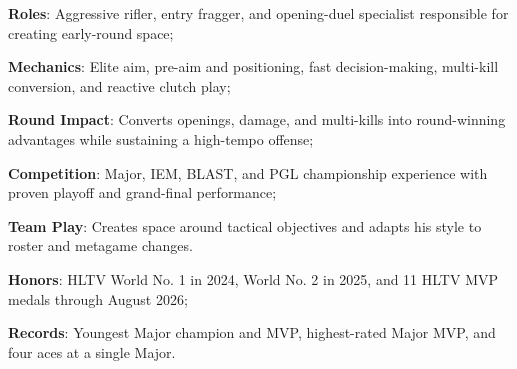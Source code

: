 \documentclass[private]{chicv}
\begin{document}


\begin{cvitems}
  \item \textbf{Roles}: Aggressive rifler, entry fragger, and opening-duel specialist responsible for creating early-round space;
  \item \textbf{Mechanics}: Elite aim, pre-aim and positioning, fast decision-making, multi-kill conversion, and reactive clutch play;
  \item \textbf{Round Impact}: Converts openings, damage, and multi-kills into round-winning advantages while sustaining a high-tempo offense;
  \item \textbf{Competition}: Major, IEM, BLAST, and PGL championship experience with proven playoff and grand-final performance;
  \item \textbf{Team Play}: Creates space around tactical objectives and adapts his style to roster and metagame changes.
\end{cvitems}


\begin{cvitems}
  \item \textbf{Honors}: HLTV World No. 1 in 2024, World No. 2 in 2025, and 11 HLTV MVP medals through August 2026;
  \item \textbf{Records}: Youngest Major champion and MVP, highest-rated Major MVP, and four aces at a single Major.
\end{cvitems}
\end{document}
